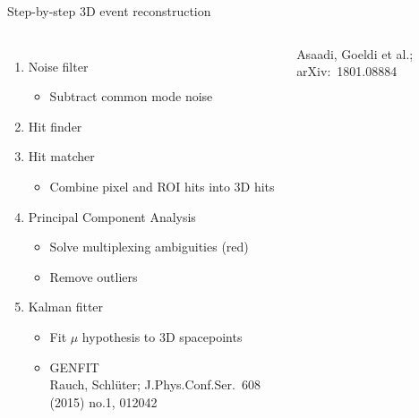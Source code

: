 \documentclass[]{beamer}
\begin{document}
\begin{frame}{Step-by-step 3D event reconstruction}{}
	\begin{columns}[c]
		\begin{enumerate}
			\item<1-> Noise filter
			\begin{itemize}
				\item Subtract common mode noise
			\end{itemize}
			\item<2-> Hit finder
			\item<2-> Hit matcher
			\begin{itemize}
				\item Combine pixel and ROI hits into 3D hits
			\end{itemize}
			\item<3-> Principal Component Analysis
			\begin{itemize}
				\item Solve multiplexing ambiguities (red)
				\item Remove outliers
			\end{itemize}
			\item<4-> Kalman fitter
			\begin{itemize}
				\item Fit $\mu$ hypothesis to 3D spacepoints
				\item GENFIT\\{\tiny Rauch, Schlüter; J.Phys.Conf.Ser.\ 608 (2015) no.1, 012042~\cite{genfit2}}
			\end{itemize}
		\end{enumerate}
		{\tiny Asaadi, Goeldi et al.; arXiv:~1801.08884~\cite{pixel_paper}}\\
		\centering

\end{columns}
\end{frame}
\end{document}
